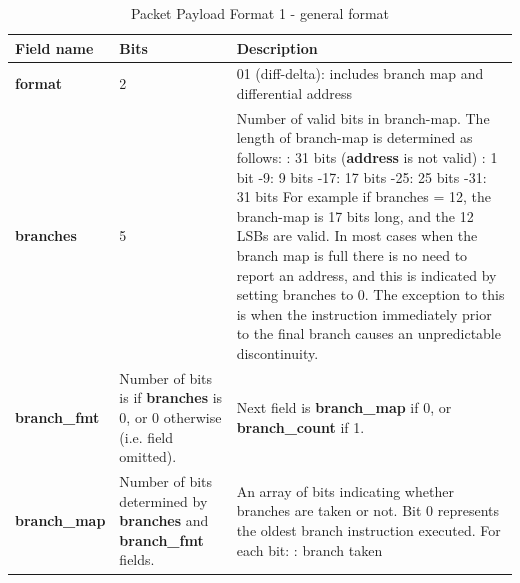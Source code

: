 \begin{table}[htp]
    \centering
    \caption{Packet Payload Format 1 - general format}
    \label{tab:te_inst0-1}
    \begin{tabulary}{\textwidth}{|l|p{35mm}|p{80mm}|}
        \hline
        {\bf Field name} & {\bf Bits} & {\bf Description} \\
        \hline
        \textbf{format}	& 2	& 01 (diff-delta): includes branch map and differential address\\
        \hline
        \textbf{branches} & 5 & Number of valid bits in branch-map. The length of branch-map is determined as follows: :      31 bits (\textbf{address} is not valid) : 	1 bit -9: 	9 bits -17: 	17 bits -25: 	25 bits -31: 	31 bits \newline
        For example if branches = 12, the branch-map is 17 bits long, and the 12 LSBs are valid. \newline
        In most cases when the branch map is full there is no need to report an address,
        and this is indicated by setting branches to 0.  The exception to this is when 
        the instruction immediately prior to the final branch causes an unpredictable discontinuity.\\
        \hline
        \textbf{branch\_fmt} & Number of bits is  if \textbf{branches} is 0, \newline
                     or 0 otherwise (i.e. field omitted). &
                     Next field is \textbf{branch\_map} if 0, or \textbf{branch\_count} if 1. \\
        \hline
        \textbf{branch\_map} & Number of bits \newline 
                     determined by \newline 
                     \textbf{branches} and \textbf{branch\_fmt} fields. & 
                     An array of bits indicating whether branches are taken or not.\newline
        Bit 0 represents the oldest branch instruction executed.   For each bit: : branch taken \newline

\end{tabulary}
\end{table}
